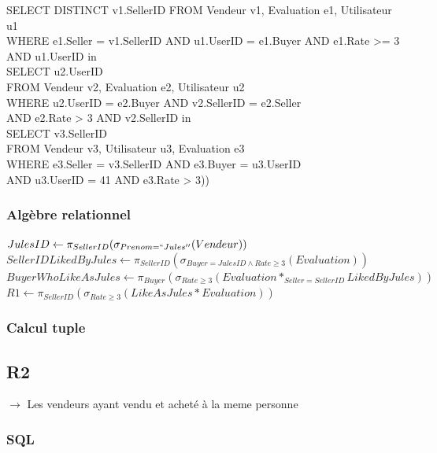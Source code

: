 \documentclass[a4paper,11pt]{article}
\begin{document}
SELECT DISTINCT v1.SellerID
FROM Vendeur v1, Evaluation e1, Utilisateur u1\\
WHERE e1.Seller = v1.SellerID AND u1.UserID = e1.Buyer AND e1.Rate >= 3 AND u1.UserID in \\
\indent \indent SELECT u2.UserID \\
\indent \indent FROM Vendeur v2, Evaluation e2, Utilisateur u2 \\
\indent \indent WHERE u2.UserID = e2.Buyer AND v2.SellerID = e2.Seller \\
\indent \indent AND e2.Rate > 3 AND v2.SellerID in \\
\indent \indent \indent \indent SELECT v3.SellerID\\
\indent \indent \indent \indent FROM Vendeur v3, Utilisateur u3, Evaluation e3\\
\indent \indent \indent \indent WHERE e3.Seller = v3.SellerID AND e3.Buyer = u3.UserID\\
\indent \indent \indent \indent AND u3.UserID = 41 AND e3.Rate > 3))

\subsubsection{Algèbre relationnel}
$JulesID \leftarrow \pi_{SellerID} ( \sigma_{Prenom=``Jules''} (Vendeur)) $ \\
$SellerIDLikedByJules \leftarrow \pi_{SellerID}(\sigma_{Buyer=JulesID \wedge Rate \geq 3} (Evaluation))$\\
$BuyerWhoLikeAsJules \leftarrow \pi_{Buyer}(\sigma_{Rate \geq 3}(Evaluation *_{Seller=SellerID} LikedByJules))$\\
$R1 \leftarrow \pi_{SellerID}(\sigma_{Rate \geq 3}(LikeAsJules*Evaluation))$

\subsubsection{Calcul tuple}

\subsection{R2}

$\rightarrow$ Les vendeurs ayant vendu et acheté à la meme personne



\subsubsection{SQL}
\end{document}
